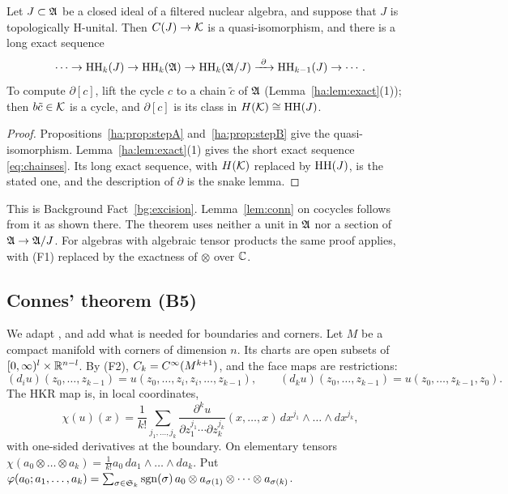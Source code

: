 \begin{theorem}\label{ha:thm:excision}
Let \(J\subset\mathfrak A\) be a closed ideal of a filtered nuclear algebra, and
suppose that \(J\) is topologically H-unital. Then \(C(J)\to\mathcal K\) is a
quasi-isomorphism, and there is a long exact sequence
\[
 \cdots\to\HH_k(J)\to\HH_k(\fA)\to\HH_k(\fA/J)\xrightarrow{\ \partial\ }
 \HH_{k-1}(J)\to\cdots .
\]
To compute \(\partial[c]\), lift the cycle \(c\) to a chain \(\tilde c\)
of \(\mathfrak A\) (Lemma~\ref{ha:lem:exact}(1)); then \(b\tilde c\in\mathcal K\) is a
cycle, and \(\partial[c]\) is its class in \(H(\mathcal K)\cong\operatorname{HH}(J)\).
\end{theorem}

\begin{proof}
Propositions~\ref{ha:prop:stepA} and~\ref{ha:prop:stepB} give the
quasi-isomorphism. Lemma~\ref{ha:lem:exact}(1) gives the short exact
sequence \eqref{eq:chainses}. Its long exact sequence, with \(H(\mathcal K)\)
replaced by \(\operatorname{HH}(J)\), is the stated one, and the description of
\(\partial\) is the snake lemma.
\end{proof}

This is Background Fact~\ref{bg:excision}. Lemma~\ref{lem:conn} on
cocycles follows from it as shown there. The theorem uses neither a unit
in \(\mathfrak A\) nor a section of \(\mathfrak A\to\mathfrak A/J\). For algebras with algebraic
tensor products the same proof applies, with (F1) replaced by the
exactness of \(\otimes\) over \(\mathbb C\).

\subsection{Connes' theorem (B5)}\label{ha:subsec:connes}

We adapt \cite[Ch.~10, ``Smooth functions'']{MelroseMicro}, and add what
is needed for boundaries and corners. Let \(M\) be a compact manifold with
corners of dimension \(n\). Its charts are open subsets of
\([0,\infty)^l\times\mathbb R^{n-l}\). By (F2), \(C_k=C^\infty(M^{k+1})\), and the face
maps are restrictions:
\[
 (d_iu)(z_0,\dots,z_{k-1})=u(z_0,\dots,z_i,z_i,\dots,z_{k-1}),\qquad
 (d_ku)(z_0,\dots,z_{k-1})=u(z_0,\dots,z_{k-1},z_0).
\]
The HKR map is, in local coordinates,
\[
 \chi(u)(x)=\frac1{k!}\sum_{j_1,\dots,j_k}
 \frac{\partial^ku}{\partial z_1^{j_1}\cdots\partial z_k^{j_k}}(x,\dots,x)\,
 dx^{j_1}\wedge\dots\wedge dx^{j_k},
\]
with one-sided derivatives at the boundary. On elementary tensors
\(\chi(a_0\otimes\dots\otimes a_k)=\frac1{k!}a_0\,da_1\wedge\dots\wedge
da_k\). Put \(\varphi(a_0;a_1,\dots,a_k)=\sum_{\sigma\in\mathfrak S_k}
\operatorname{sgn}(\sigma)\,a_0\otimes a_{\sigma(1)}\otimes\dots\otimes a_{\sigma(k)}\).

